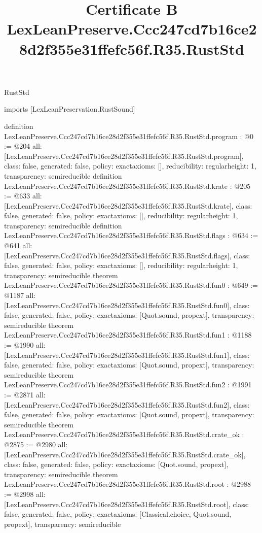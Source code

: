 \begin{lexlean}{RustStd}
\title{Certificate B LexLeanPreserve.Ccc247cd7b16ce28d2f355e31ffefc56f.R35.RustStd}
\begin{coremodule}
imports [LexLeanPreservation.RustSound]

definition LexLeanPreserve.Ccc247cd7b16ce28d2f355e31ffefc56f.R35.RustStd.program : @0 := @204 {
  all: [LexLeanPreserve.Ccc247cd7b16ce28d2f355e31ffefc56f.R35.RustStd.program],
  class: false,
  generated: false,
  policy: exact{axioms: []},
  reducibility: regular{height: 1},
  transparency: semireducible
}
definition LexLeanPreserve.Ccc247cd7b16ce28d2f355e31ffefc56f.R35.RustStd.krate : @205 := @633 {
  all: [LexLeanPreserve.Ccc247cd7b16ce28d2f355e31ffefc56f.R35.RustStd.krate],
  class: false,
  generated: false,
  policy: exact{axioms: []},
  reducibility: regular{height: 1},
  transparency: semireducible
}
definition LexLeanPreserve.Ccc247cd7b16ce28d2f355e31ffefc56f.R35.RustStd.flags : @634 := @641 {
  all: [LexLeanPreserve.Ccc247cd7b16ce28d2f355e31ffefc56f.R35.RustStd.flags],
  class: false,
  generated: false,
  policy: exact{axioms: []},
  reducibility: regular{height: 1},
  transparency: semireducible
}
theorem LexLeanPreserve.Ccc247cd7b16ce28d2f355e31ffefc56f.R35.RustStd.fun0 : @649 := @1187 {
  all: [LexLeanPreserve.Ccc247cd7b16ce28d2f355e31ffefc56f.R35.RustStd.fun0],
  class: false,
  generated: false,
  policy: exact{axioms: [Quot.sound, propext]},
  transparency: semireducible
}
theorem LexLeanPreserve.Ccc247cd7b16ce28d2f355e31ffefc56f.R35.RustStd.fun1 : @1188 := @1990 {
  all: [LexLeanPreserve.Ccc247cd7b16ce28d2f355e31ffefc56f.R35.RustStd.fun1],
  class: false,
  generated: false,
  policy: exact{axioms: [Quot.sound, propext]},
  transparency: semireducible
}
theorem LexLeanPreserve.Ccc247cd7b16ce28d2f355e31ffefc56f.R35.RustStd.fun2 : @1991 := @2871 {
  all: [LexLeanPreserve.Ccc247cd7b16ce28d2f355e31ffefc56f.R35.RustStd.fun2],
  class: false,
  generated: false,
  policy: exact{axioms: [Quot.sound, propext]},
  transparency: semireducible
}
theorem LexLeanPreserve.Ccc247cd7b16ce28d2f355e31ffefc56f.R35.RustStd.crate_ok : @2875 := @2980 {
  all: [LexLeanPreserve.Ccc247cd7b16ce28d2f355e31ffefc56f.R35.RustStd.crate_ok],
  class: false,
  generated: false,
  policy: exact{axioms: [Quot.sound, propext]},
  transparency: semireducible
}
theorem LexLeanPreserve.Ccc247cd7b16ce28d2f355e31ffefc56f.R35.RustStd.root : @2988 := @2998 {
  all: [LexLeanPreserve.Ccc247cd7b16ce28d2f355e31ffefc56f.R35.RustStd.root],
  class: false,
  generated: false,
  policy: exact{axioms: [Classical.choice, Quot.sound, propext]},
  transparency: semireducible
}


\end{coremodule}
\end{lexlean}
